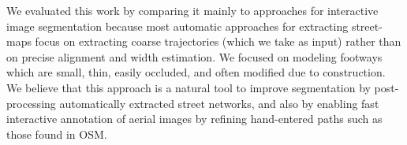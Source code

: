 We evaluated this work by comparing it mainly to approaches for interactive image segmentation because most automatic approaches for extracting street-maps focus on extracting coarse trajectories (which we take as input) rather than on precise alignment and width estimation. We focused on modeling footways which are small, thin, easily occluded, and often modified due to construction. We believe that this approach is a natural tool to improve segmentation by post-processing automatically extracted street networks, and also by enabling fast interactive annotation of aerial images by refining hand-entered paths such as those found in \ac{OSM}.  


\FloatBarrier



\